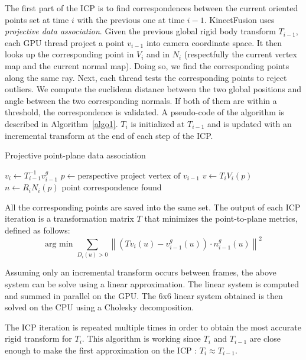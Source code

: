 \documentclass[12pt]{article}
\begin{document}
The first part of the ICP is to find correspondences between the current oriented points set at time $i$ with the previous one at time $i-1$. KinectFusion uses \textit{projective data association}. Given the previous global rigid body transform $T_{i-1}$, each GPU thread project a point $v_{i-1}$ into camera coordinate space. It then looks up the corresponding point in $V_i$ and in $N_i$ (respectfully the current vertex map and the current normal map). Doing so, we find the corresponding points along the same ray. Next, each thread tests the corresponding points to reject outliers. We compute the euclidean distance between the two global positions and angle between the two corresponding normals. If both of them are within a threshold, the correspondence is validated. A pseudo-code of the algorithm is described in Algorithm~\ref{algo1}. $T_i$ is initialized at $T_{i-1}$ and is updated with an incremental transform at the end of each step of the ICP.

\begin{algorithm}
\caption{Projective point-plane data association}\label{algo1}
\begin{algorithmic}[1]
  \State $v_i \gets T_{i-1}^{-1}v_{i-1}^g$
  \State $p \gets \text{perspective project vertex of } v_{i-1}$
    \State $v \gets T_iV_i(p)$
    \State $n \gets R_iN_i(p)$
      \State point correspondence found
      \EndIf
    \EndIf
  \EndIf
\EndFor
\end{algorithmic}
\end{algorithm}

All the corresponding points are saved into the same set. The output of each ICP iteration is a transformation matrix $T$ that minimizes the point-to-plane metrics, defined as follows:
$$\text{arg min } \sum_{D_i(u)>0} \left\|(Tv_i(u)-v_{i-1}^g(u))\cdot n_{i-1}^g(u) \right\|^2$$

Assuming only an incremental transform occurs between frames, the above system can be solve using a linear approximation. The linear system is computed and summed in parallel on the GPU. The 6x6 linear system obtained is then solved on the CPU using a Cholesky decomposition.

The ICP iteration is repeated multiple times in order to obtain the most accurate rigid transform for $T_i$. This algorithm is working since $T_i$ and $T_{i-1}$ are close enough to make the first approximation on the ICP : $T_i \approx T_{i-1}$.
\end{document}
